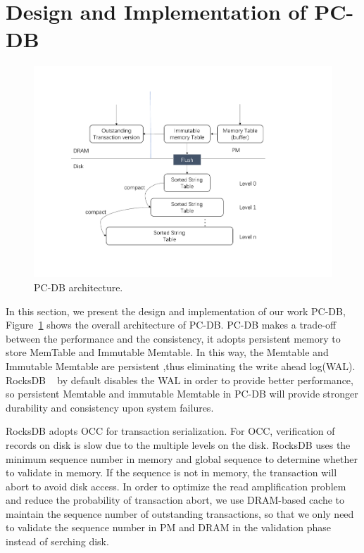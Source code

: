 \section{Design and Implementation of PC-DB}

    \begin{figure}
        \centering
        \includegraphics[width=0.36\paperwidth]{figure/structure.pdf}
        \caption{PC-DB architecture.}
        \label{fig:structure}
    \end{figure}
In this section, we present the design and implementation of our work PC-DB, Figure~\ref{fig:structure} shows the overall architecture of PC-DB. PC-DB makes a trade-off between the performance and the consistency, it adopts persistent memory to store MemTable and Immutable Memtable. 
In this way, the Memtable and Immutable Memtable are persistent ,thus eliminating the write ahead log(WAL). 
RocksDB ~\cite{RocksDB} by default disables the WAL in order to provide better performance, 
so persistent Memtable and immutable Memtable in PC-DB will provide stronger durability and consistency upon system failures.

RocksDB adopts OCC for transaction serialization.
For OCC, verification of records on disk is slow due to the multiple levels on the disk. 
RocksDB uses the minimum sequence number in memory and global sequence to determine whether to validate in memory. 
If the sequence is not in memory, the transaction will abort to avoid disk access.
In order to optimize the read amplification problem and reduce the probability of transaction abort, 
we use DRAM-based cache to maintain the sequence number of outstanding transactions, 
so that we only need to validate the sequence number in PM and DRAM in the validation phase instead of serching disk.




